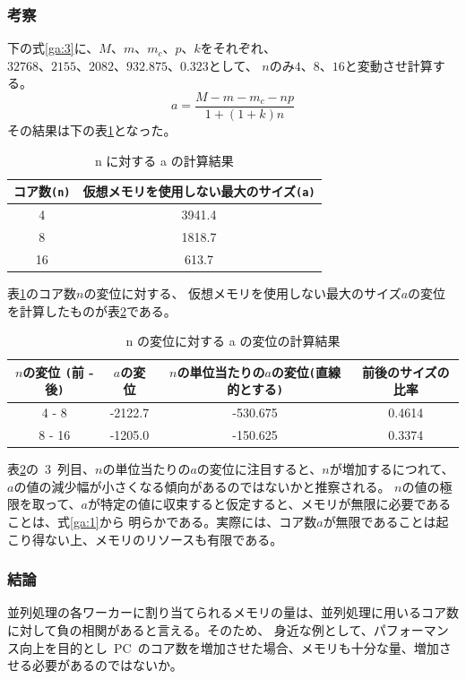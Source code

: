 \documentclass[10pt]{jarticle}
\begin{document}
\subsubsection{考察}
%
下の式\ref{ga:3}に、$ M、m、m_{c}、p、k $をそれぞれ、$ 32768、2155、2082、932.875、0.323 $として、
$ n $のみ$ 4、8、16 $と変動させ計算する。
\begin{equation}
	a = \frac{M - m - m_{c} - np}{1 + (1 + k) n}\label{ga:3}
\end{equation}
その結果は下の表\ref{table:12}となった。
\begin{table}[htbp]
	\centering
	\caption{ n に対する a の計算結果}
	\label{table:12}
	\begin{tabular}{|c|c|}
		\hline
		コア数\verb|(n)| & 仮想メモリを使用しない最大のサイズ\verb|(a)|\\
		\hline
		4  & 3941.4\\
		8  & 1818.7\\
		16 &  613.7\\
		\hline
	\end{tabular}
\end{table}
表\ref{table:12}のコア数$ n $の変位に対する、 
仮想メモリを使用しない最大のサイズ$ a $の変位
を計算したものが表\ref{table:12h}である。
\begin{table}[htbp]
	\centering
	\caption{ n の変位に対する a の変位の計算結果}
	\label{table:12h}
	\begin{tabular}{|c|c|c|c|}
		\hline
		$ n $の変位 \verb|(|前 - 後\verb|)| & $ a $の変位 & $ n $の単位当たりの$ a $の変位\verb|(|直線的とする\verb|)| & 前後のサイズの比率\\
		\hline
		4 - 8  & -2122.7 & -530.675 & 0.4614\\
		8 - 16 & -1205.0 & -150.625 & 0.3374\\
		\hline
	\end{tabular}
\end{table}
表\ref{table:12h}の\ 3\ 列目、$ n $の単位当たりの$ a $の変位に注目すると、$ n $が増加するにつれて、
$ a $の値の減少幅が小さくなる傾向があるのではないかと推察される。
$ n $の値の極限を取って、$ a $が特定の値に収束すると仮定すると、メモリが無限に必要であることは、式\ref{ga:1}から
明らかである。実際には、コア数$ a $が無限であることは起こり得ない上、メモリのリソースも有限である。
%

\subsubsection{結論}
%
並列処理の各ワーカーに割り当てられるメモリの量は、並列処理に用いるコア数に対して負の相関があると言える。そのため、
身近な例として、パフォーマンス向上を目的とし\ PC\ のコア数を増加させた場合、メモリも十分な量、増加させる必要があるのではないか。
%
\end{document}
